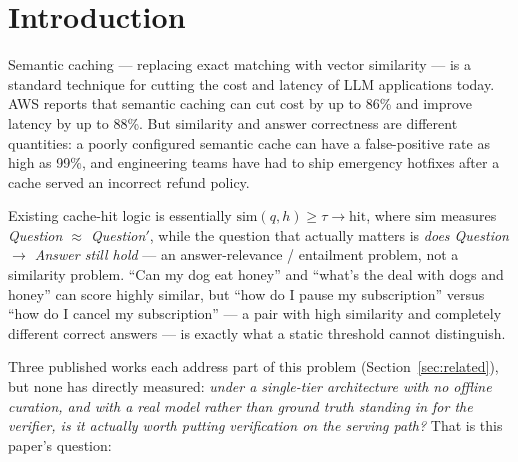 \documentclass[11pt]{article}
\begin{document}
\begin{abstract}
\textbf{Recovering a discarded signal, and non-stationarity} (Sections~\ref{sec:qcached}--\ref{sec:acitheorem}): feeding the similarity score discarded by the architecture since its original design back into the decision rule (a joint decision rule) widens the hit-rate/error-rate Pareto frontier for free on datasets where the verifier's own discriminative power is weak, an effect confirmed causal rather than merely correlational; and when the gray-zone positive rate itself undergoes severe non-stationary drift, so that any ``fit a static threshold, then deploy'' protocol fails, switching to an online adaptive threshold (ACI) carrying the same kind of finite-sample formal guarantee raises hit rate by 8--140x while tracking the target error rate more closely.
\end{abstract}

\section{Introduction}
\label{sec:intro}

Semantic caching --- replacing exact matching with vector similarity --- is a standard technique for cutting the cost and latency of LLM applications today. AWS reports that semantic caching can cut cost by up to 86\% and improve latency by up to 88\%. But similarity and answer correctness are different quantities: a poorly configured semantic cache can have a false-positive rate as high as 99\%, and engineering teams have had to ship emergency hotfixes after a cache served an incorrect refund policy.

Existing cache-hit logic is essentially $\text{sim}(q, h) \geq \tau \rightarrow \text{hit}$, where $\text{sim}$ measures \emph{Question $\approx$ Question$'$}, while the question that actually matters is \emph{does Question $\rightarrow$ Answer still hold} --- an answer-relevance / entailment problem, not a similarity problem. ``Can my dog eat honey'' and ``what's the deal with dogs and honey'' can score highly similar, but ``how do I pause my subscription'' versus ``how do I cancel my subscription'' --- a pair with high similarity and completely different correct answers --- is exactly what a static threshold cannot distinguish.

Three published works each address part of this problem (Section~\ref{sec:related}), but none has directly measured: \emph{under a single-tier architecture with no offline curation, and with a real model rather than ground truth standing in for the verifier, is it actually worth putting verification on the serving path?} That is this paper's question:
\end{document}
